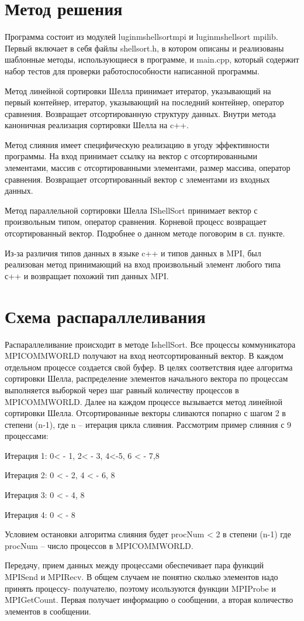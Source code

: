 \documentclass{report}
\begin{document}
\section*{Метод решения}
Программа состоит из модулей luginmshellsortmpi и luginmshellsort mpilib. Первый включает в себя файлы shellsort.h, в котором описаны и реализованы шаблонные методы, использующиеся в программе, и main.cpp, который содержит набор тестов для проверки работоспособности написанной программы.
\par
Метод линейной сортировки Шелла принимает итератор, указывающий на первый контейнер, итератор, указывающий на последний контейнер, оператор сравнения. Возвращает отсортированную структуру данных. Внутри метода каноничная реализация сортировки Шелла на c++.
\par
Метод слияния имеет специфическую реализацию в угоду эффективности программы. На вход принимает ссылку на вектор с отсортированными элементами, массив с отсортированными элементами, размер массива, оператор сравнения. Возвращает отсортированный вектор с элементами из входных данных.
\par 
Метод параллельной сортировки Шелла IShellSort принимает вектор с произвольным типом, оператор сравнения. Корневой процесс возвращает отсортированный вектор. Подробнее о данном методе поговорим в сл. пункте.
\par 
Из-за различия типов данных в языке c++ и типов данных в MPI, был реализован метод принимающий на вход произвольный элемент любого типа с++ и возвращает похожий тип данных MPI.
\newpage

\section*{Схема распараллеливания}
Распараллеливание происходит в методе IshellSort. Все процессы коммуникатора MPICOMMWORLD получают на вход неотсортированный вектор. В каждом отдельном процессе создается свой буфер. В целях соответствия идее алгоритма сортировки Шелла, распределение элементов начального вектора по процессам выполняется выборкой через шаг равный количеству процессов в MPICOMMWORLD. Далее на каждом процессе вызывается метод линейной сортировки Шелла. Отсортированные векторы сливаются попарно с шагом 2 в степени (n-1), где n – итерация цикла слияния.
Рассмотрим пример слияния с 9 процессами:
\par
Итерация 1: 0< - 1, 2< - 3, 4<-5, 6  < - 7,8
\par
Итерация 2: 0 < - 2, 4  < - 6, 8 
\par
Итерация 3: 0 < - 4, 8 
\par
Итерация 4: 0 < - 8
\par
Условием остановки алгоритма слияния будет procNum < 2 в степени (n-1) где procNum – число процессов в MPICOMMWORLD.
\par
Передачу, прием данных между процессами обеспечивает пара функций MPISend и MPIRecv. В общем случаем не понятно сколько элементов надо принять процессу- получателю, поэтому исользуются функции MPIProbe и MPIGetCount. Первая получает информацию о сообщении, а вторая количество элементов в сообщении.
\newpage
\end{document}
